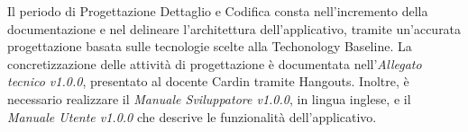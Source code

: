 Il periodo di Progettazione Dettaglio e Codifica consta nell'incremento della documentazione e nel delineare l'architettura dell'applicativo, tramite un'accurata progettazione basata sulle tecnologie scelte alla Techonology Baseline. La concretizzazione delle attività di progettazione è documentata nell'\textit{Allegato tecnico v1.0.0}, presentato al docente Cardin tramite Hangouts. Inoltre, è necessario realizzare il \textit{Manuale Sviluppatore v1.0.0}, in lingua inglese, e il \textit{Manuale Utente v1.0.0} che descrive le funzionalità dell'applicativo.